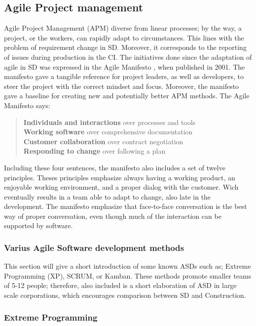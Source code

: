 \subsection{Agile Project management}
Agile Project Management (APM) diverse from linear processes; by the way, a project, or the workers, can rapidly adapt to circumstances. This lines with the problem of requirement change in SD. Moreover, it corresponds to the reporting of issues during production in the CI. The initiatives done since the adaptation of agile in SD was expressed in the Agile Manifesto \cite{agile_manifesto}, when published in 2001. The manifesto gave a tangible reference for project leaders, as well as developers, to steer the project with the correct mindset and focus. Moreover, the manifesto gave a baseline for creating new and potentially better APM methods. The Agile Manifesto says:
\begin{quote}
    {\bf Individuals and interactions} over processes and tools \\
    {\bf Working software} over comprehensive documentation \\
    {\bf Customer collaboration} over contract negotiation \\
    {\bf Responding to change} over following a plan \\
\end{quote}
Including these four sentences, the manifesto also includes a set of twelve principles. Theses principles emphasize always having a working product, an enjoyable working environment, and a proper dialog with the customer. Wich eventually results in a team able to adapt to change,  also late in the development. The manifesto emphasize that face-to-face conversation is the best way of proper conversation, even though much of the interaction can be supported by software.

\subsubsection{Varius Agile Software development methods}
This section will give a short introduction of some known ASDs such as; Extreme Programming (XP), SCRUM, or Kamban. These methods promote smaller teams of 5-12 people; therefore, also included is a short elaboration of ASD in large scale corporations, which encourages comparison between SD and Construction.

\subsubsection{Extreme Programming}
